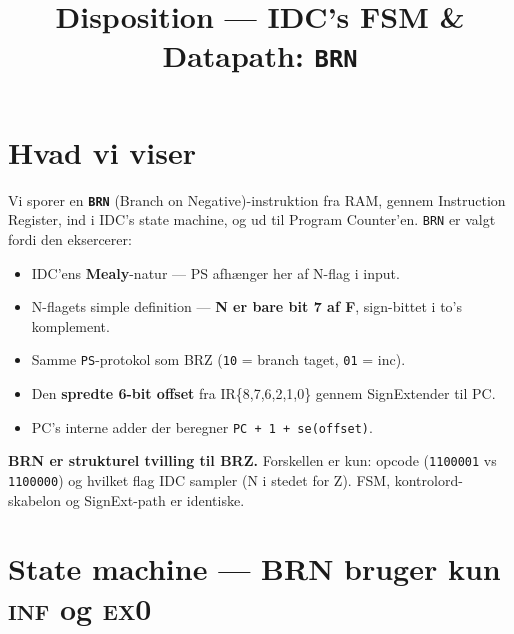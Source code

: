 \documentclass[11pt,a4paper]{article}
\title{\vspace{-1em}\textcolor{accent}{\Large Disposition --- IDC's FSM \& Datapath: \texttt{BRN}}}
\author{}
\date{}
\begin{document}
\maketitle
\vspace{-3em}

\section*{Hvad vi viser}

Vi sporer en \textbf{\texttt{BRN}} (Branch on Negative)-instruktion
fra RAM, gennem Instruction Register, ind i IDC's state machine,
og ud til Program Counter'en. \texttt{BRN} er valgt fordi den eksercerer:

\begin{itemize}
  \item IDC'ens \textbf{Mealy}-natur --- PS afhænger her af N-flag i input.
  \item N-flagets simple definition --- \textbf{N er bare bit 7 af F}, sign-bittet i to's komplement.
  \item Samme \texttt{PS}-protokol som BRZ (\texttt{10} = branch taget, \texttt{01} = inc).
  \item Den \textbf{spredte 6-bit offset} fra IR\{8,7,6,2,1,0\} gennem SignExtender til PC.
  \item PC's interne adder der beregner \texttt{PC + 1 + se(offset)}.
\end{itemize}

\textbf{BRN er strukturel tvilling til BRZ.} Forskellen er kun: opcode (\texttt{1100001} vs \texttt{1100000})
og hvilket flag IDC sampler (N i stedet for Z). FSM, kontrolord-skabelon og SignExt-path er identiske.

\section*{State machine --- BRN bruger kun \textsc{inf} og \textsc{ex0}}

\begin{center}
\end{center}
\end{document}
